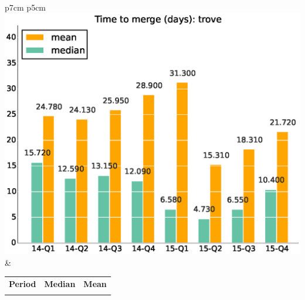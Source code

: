 \documentclass[a4wide,11pt]{article}
\begin{document}
\begin{tabular}{p{7cm} p{5cm}}
    \vspace{0pt} 
    \includegraphics[scale=.35]{figs/timetoreview_mediantrove.eps}
    & 
    \vspace{0pt}
    \begin{tabular}{l|r|r|}%
    \bfseries Period & \bfseries Median & \bfseries Mean %
    \csvreader[head to column names]{data/timetoreview_mediantrove.csv}{}%
    {\\ & \mediantime & \meantime}
    \end{tabular}
\end{tabular}
\end{document}
